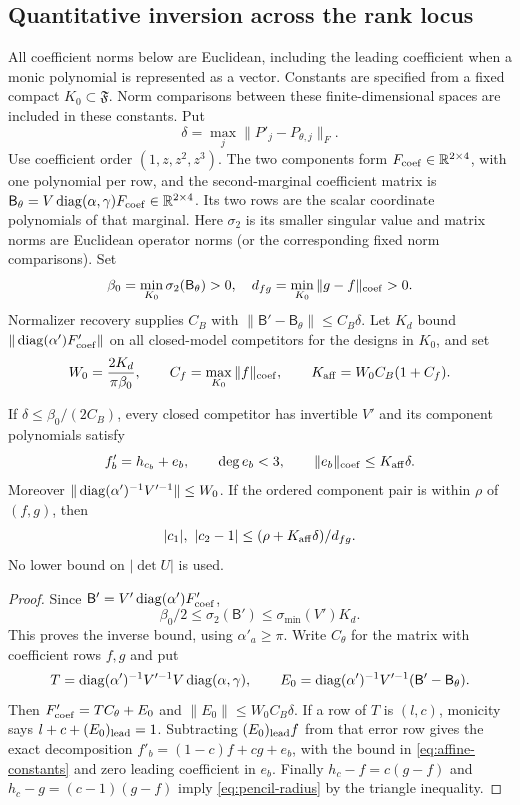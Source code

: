 \subsection{Quantitative inversion across the rank locus}
All coefficient norms below are Euclidean, including the leading
coefficient when a monic polynomial is represented as a vector. Constants
are specified from a fixed compact $K_0\subset\mathfrak F$. Norm
comparisons between these finite-dimensional spaces are included in
these constants. Put
\[
 \delta=\max_j\|P'_j-P_{\theta,j}\|_F.
\]
Use coefficient order $(1,z,z^2,z^3)$. The two components form
$F_{\mathrm{coef}}\in\mathbb R^{2\times4}$, with one polynomial per row, and the
second-marginal coefficient matrix is
$\mathsf B_\theta=V\operatorname{diag}(\alpha,\gamma)F_{\mathrm{coef}}\in\mathbb R^{2\times4}$.
Its two rows are the scalar coordinate polynomials of that marginal.
Here $\sigma_2$ is its smaller singular value and matrix norms are
Euclidean operator norms (or the corresponding fixed norm comparisons). Set
\[
 \beta_0=\min_{K_0}\sigma_2(\mathsf B_\theta)>0,\quad
 d_{fg}=\min_{K_0}\|g-f\|_{\mathrm{coef}}>0.
\]
Normalizer recovery supplies $C_B$ with
$\|\mathsf B'-\mathsf B_\theta\|\le C_B\delta$.
Let $K_d$ bound $\|\operatorname{diag}(\alpha')F'_{\mathrm{coef}}\|$ on all closed-model
competitors for the designs in $K_0$, and set
\begin{equation}\label{eq:affine-constants}
 W_0=\frac{2K_d}{\pi\beta_0},\qquad
 C_f=\max_{K_0}\|f\|_{\mathrm{coef}},\qquad
 K_{\rm aff}=W_0C_B(1+C_f).
\end{equation}

\begin{proposition}\label{prop:affine}
If $\delta\le\beta_0/(2C_B)$, every closed competitor has invertible
$V'$ and its component polynomials satisfy
\begin{equation}\label{eq:affine-approx}
 f'_b=h_{c_b}+e_b,\qquad \deg e_b<3,\qquad
 \|e_b\|_{\mathrm{coef}}\le K_{\rm aff}\delta.
\end{equation}
Moreover $\|\operatorname{diag}(\alpha')^{-1}V'^{-1}\|\le W_0$. If the ordered
component pair is within $\rho$ of $(f,g)$, then
\begin{equation}\label{eq:pencil-radius}
 |c_1|,\ |c_2-1|\le(\rho+K_{\rm aff}\delta)/d_{fg}.
\end{equation}
No lower bound on $|\det U|$ is used.
\end{proposition}
\begin{proof}
Since $\mathsf B'=V'\operatorname{diag}(\alpha')F'_{\mathrm{coef}}$,
\[
 \beta_0/2\le\sigma_2(\mathsf B')
        \le\sigma_{\min}(V')K_d.
\]
This proves the inverse bound, using $\alpha'_a\ge\pi$.
Write $C_\theta$ for the matrix with coefficient rows $f,g$ and put
\[
 T=\operatorname{diag}(\alpha')^{-1}V'^{-1}V\operatorname{diag}(\alpha,\gamma),\qquad
 E_0=\operatorname{diag}(\alpha')^{-1}V'^{-1}(\mathsf B'-\mathsf B_\theta).
\]
Then $F'_{\mathrm{coef}}=TC_\theta+E_0$ and $\|E_0\|\le W_0C_B\delta$.
If a row of $T$ is $(l,c)$, monicity says
$l+c+(E_0)_{\rm lead}=1$. Subtracting $(E_0)_{\rm lead}f$ from
that error row gives the exact decomposition
$f'_b=(1-c)f+cg+e_b$, with the bound in
\eqref{eq:affine-constants} and zero leading coefficient in $e_b$.
Finally $h_c-f=c(g-f)$ and $h_c-g=(c-1)(g-f)$ imply
\eqref{eq:pencil-radius} by the triangle inequality.
\end{proof}

